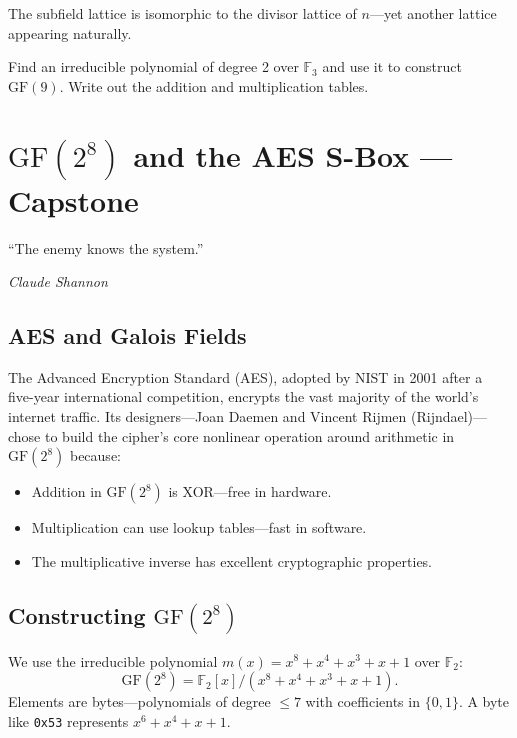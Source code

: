 \documentclass[11pt, a4paper, oneside]{book}
\newcommand{\F}{\mathbb{F}}
\newcommand{\GF}{\mathrm{GF}}
\newcounter{exercise}[chapter]
\begin{document}
The subfield lattice is isomorphic to the divisor lattice of $n$---yet
another lattice appearing naturally.

\begin{exercisebox}[title={Exercise 11.1}]
Find an irreducible polynomial of degree 2 over $\F_3$ and use it to construct
$\GF(9)$. Write out the addition and multiplication tables.
\end{exercisebox}

\chapter{$\GF(2^8)$ and the AES S-Box --- Capstone}

\epigraph{``The enemy knows the system.''}{\textit{Claude Shannon}}

\section{AES and Galois Fields}

\begin{historical}[title={The Advanced Encryption Standard}]
The Advanced Encryption Standard (AES), adopted by NIST in 2001 after a
five-year international competition, encrypts the vast majority of the
world's internet traffic. Its designers---Joan Daemen and Vincent Rijmen
(Rijndael)---chose to build the cipher's core nonlinear operation around
arithmetic in $\GF(2^8)$ because:
\begin{itemize}[nosep]
\item Addition in $\GF(2^8)$ is XOR---free in hardware.
\item Multiplication can use lookup tables---fast in software.
\item The multiplicative inverse has excellent cryptographic properties.
\end{itemize}
\end{historical}

\section{Constructing $\GF(2^8)$}

We use the irreducible polynomial $m(x) = x^8 + x^4 + x^3 + x + 1$ over
$\F_2$:
\[
  \GF(2^8) = \F_2[x]/(x^8 + x^4 + x^3 + x + 1).
\]
Elements are bytes---polynomials of degree $\leq 7$ with coefficients in
$\{0, 1\}$. A byte like \texttt{0x53} represents $x^6 + x^4 + x + 1$.
\end{document}
